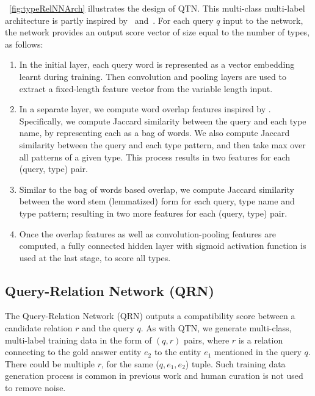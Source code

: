 \documentclass{svjour3}
\begin{document}
\figurename~\ref{fig:typeRelNNArch} illustrates the design of QTN. This multi-class multi-label architecture is partly inspired
by~\cite{Kim2014ConvnetSentence} and~\cite{SeverynM2015SiamConvNet}. For each query $q$
input to the network, the network provides an output score vector of
size equal to the number of types, as follows:  
\begin{enumerate} 
\item In the initial layer, each query word is represented as a vector embedding learnt during training.  
Then convolution and pooling layers are used to extract a fixed-length feature vector from the variable length input.
\item 
In a separate layer, we compute word overlap features inspired by \cite{SeverynM2015SiamConvNet}.
Specifically, we compute Jaccard similarity between the query 
and each type name, by representing each as a bag of words. 
We also compute Jaccard similarity between the query and each type pattern, 
and then take max over all patterns of a given type. This process results in two features
for each (query, type) pair.
\item Similar to the bag of words based overlap, we compute Jaccard similarity between the word stem (lemmatized) form for each query, type name and type pattern; resulting in two more features for each (query, type) pair.  
\item Once the overlap features as well as convolution-pooling features are computed,
a fully connected hidden layer with sigmoid activation function is
used at the last stage, to score all types.
\end{enumerate}


\subsection{Query-Relation Network (QRN)}
\label{sec:qrn}

The Query-Relation Network (QRN) outputs a compatibility score between a candidate
relation $r$ and the query $q$.  As with QTN, we generate multi-class,
multi-label training data in the form of $(q, r)$ pairs, where $r$ is
a relation connecting to the gold answer entity $e_2$ to the entity
$e_1$ mentioned in the query $q$.  There could be multiple $r$, for
the same ($q, e_1, e_2$) tuple.  Such training data generation process
is common in previous work
\citep{Dong:2015,YihCHG2015STAGG,bordes2014question} and human curation is not
used to remove noise.
\end{document}
